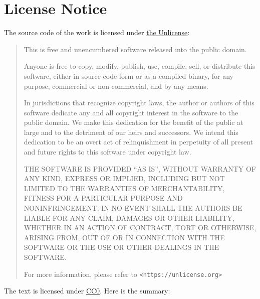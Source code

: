 \section*{License Notice}

{\sffamily The source code of the work is licensed under \hyperref{https://unlicense.org/}{}{}{the Unlicense}:}

\begin{flushleft}
    \begin{quote}
        This is free and unencumbered software released into the public domain.

        Anyone is free to copy, modify, publish, use, compile, sell, or distribute this software, either in source code form or as a compiled binary, for any purpose, commercial or non-commercial, and by any means.

        In jurisdictions that recognize copyright laws, the author or authors of this software dedicate any and all copyright interest in the software to the public domain. We make this dedication for the benefit of the public at large and to the detriment of our heirs and successors. We intend this dedication to be an overt act of relinquishment in perpetuity of all present and future rights to this software under copyright law.

        THE SOFTWARE IS PROVIDED ``AS IS'', WITHOUT WARRANTY OF ANY KIND, EXPRESS OR IMPLIED, INCLUDING BUT NOT LIMITED TO THE WARRANTIES OF MERCHANTABILITY, FITNESS FOR A PARTICULAR PURPOSE AND NONINFRINGEMENT. IN NO EVENT SHALL THE AUTHORS BE LIABLE FOR ANY CLAIM, DAMAGES OR OTHER LIABILITY, WHETHER IN AN ACTION OF CONTRACT, TORT OR OTHERWISE, ARISING FROM, OUT OF OR IN CONNECTION WITH THE SOFTWARE OR THE USE OR OTHER DEALINGS IN THE SOFTWARE.

        For more information, please refer to \texttt{<https://unlicense.org>}
    \end{quote}
\end{flushleft}

{\sffamily The text is licensed under \hyperref{https://creativecommons.org/publicdomain/zero/1.0/}{}{}{CC0}. Here is the summary:}

